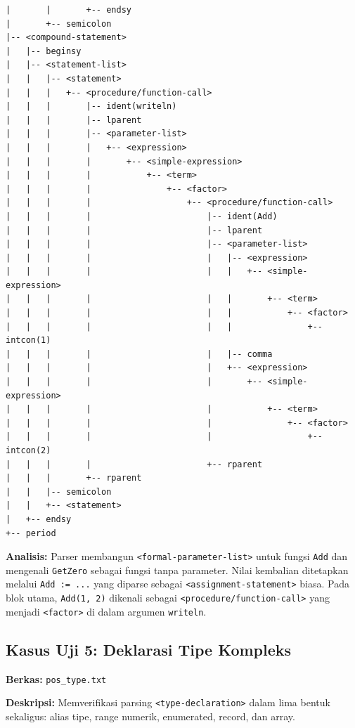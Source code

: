 \documentclass[12pt,a4paper]{article}
\begin{document}
\begin{lstlisting}[style=default]
|       |       +-- endsy
|       +-- semicolon
|-- <compound-statement>
|   |-- beginsy
|   |-- <statement-list>
|   |   |-- <statement>
|   |   |   +-- <procedure/function-call>
|   |   |       |-- ident(writeln)
|   |   |       |-- lparent
|   |   |       |-- <parameter-list>
|   |   |       |   +-- <expression>
|   |   |       |       +-- <simple-expression>
|   |   |       |           +-- <term>
|   |   |       |               +-- <factor>
|   |   |       |                   +-- <procedure/function-call>
|   |   |       |                       |-- ident(Add)
|   |   |       |                       |-- lparent
|   |   |       |                       |-- <parameter-list>
|   |   |       |                       |   |-- <expression>
|   |   |       |                       |   |   +-- <simple-expression>
|   |   |       |                       |   |       +-- <term>
|   |   |       |                       |   |           +-- <factor>
|   |   |       |                       |   |               +-- intcon(1)
|   |   |       |                       |   |-- comma
|   |   |       |                       |   +-- <expression>
|   |   |       |                       |       +-- <simple-expression>
|   |   |       |                       |           +-- <term>
|   |   |       |                       |               +-- <factor>
|   |   |       |                       |                   +-- intcon(2)
|   |   |       |                       +-- rparent
|   |   |       +-- rparent
|   |   |-- semicolon
|   |   +-- <statement>
|   +-- endsy
+-- period
\end{lstlisting}

\textbf{Analisis:} Parser membangun \texttt{<formal-parameter-list>} untuk fungsi \texttt{Add} dan mengenali \texttt{GetZero} sebagai fungsi tanpa parameter. Nilai kembalian ditetapkan melalui \texttt{Add := ...} yang diparse sebagai \texttt{<assignment-statement>} biasa. Pada blok utama, \texttt{Add(1, 2)} dikenali sebagai \texttt{<procedure/function-call>} yang menjadi \texttt{<factor>} di dalam argumen \texttt{writeln}.

\subsection{Kasus Uji 5: Deklarasi Tipe Kompleks}
\textbf{Berkas:} \texttt{pos\_type.txt}

\textbf{Deskripsi:} Memverifikasi parsing \texttt{<type-declaration>} dalam lima bentuk sekaligus: alias tipe, range numerik, enumerated, record, dan array.
\end{document}
